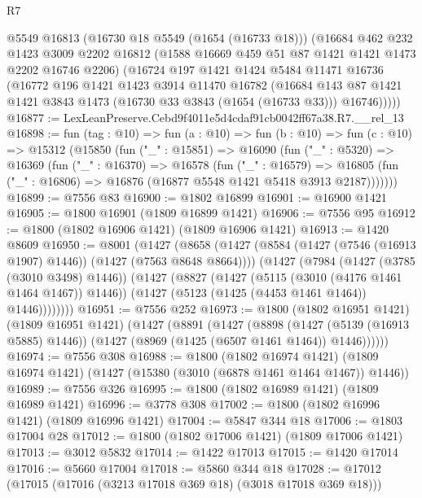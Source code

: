 \begin{lexlean}{R7}
\begin{coremodule}
      @5549
      @16813
      (@16730 @18 @5549 (@1654 (@16733 @18)))
      (@16684
        @462
        @232
        @1423
        @3009
        @2202
        @16812
        (@1588 @16669 @459 @51 @87 @1421 @1421 @1473 @2202 @16746 @2206)
        (@16724
          @197
          @1421
          @1424
          @5484
          @11471
          @16736
          (@16772
            @196
            @1421
            @1423
            @3914
            @11470
            @16782
            (@16684
              @143
              @87
              @1421
              @1421
              @3843
              @1473
              (@16730 @33 @3843 (@1654 (@16733 @33)))
              @16746)))))
@16877 := LexLeanPreserve.Cebd9f4011e5d4cdaf91cb0042ff67a38.R7.__rel_13
@16898 := fun (tag : @10) =>
  fun (a : @10) =>
  fun (b : @10) =>
  fun (c : @10) =>
  @15312
    (@15850
      (fun ("_" : @15851) =>
      @16090
        (fun ("_" : @5320) =>
        @16369
          (fun ("_" : @16370) =>
          @16578
            (fun ("_" : @16579) =>
            @16805 (fun ("_" : @16806) => @16876 (@16877 @5548 @1421 @5418 @3913 @2187)))))))
@16899 := @7556 @83
@16900 := @1802 @16899
@16901 := @16900 @1421
@16905 := @1800 @16901 (@1809 @16899 @1421)
@16906 := @7556 @95
@16912 := @1800 (@1802 @16906 @1421) (@1809 @16906 @1421)
@16913 := @1420 @8609
@16950 := @8001
    (@1427
      (@8658
        (@1427 (@8584 (@1427 (@7546 (@16913 @1907) @1446)) (@1427 (@7563 @8648 @8664))))
        (@1427
          (@7984
            (@1427 (@3785 (@3010 @3498) @1446))
            (@1427
              (@8827
                (@1427 (@5115 (@3010 (@4176 @1461 @1464 @1467)) @1446))
                (@1427 (@5123 (@1425 (@4453 @1461 @1464)) @1446))))))))
@16951 := @7556 @252
@16973 := @1800
    (@1802 @16951 @1421)
    (@1809 @16951 @1421)
    (@1427
      (@8891
        (@1427
          (@8898
            (@1427 (@5139 (@16913 @5885) @1446))
            (@1427 (@8969 (@1425 (@6507 @1461 @1464)) @1446))))))
@16974 := @7556 @308
@16988 := @1800
    (@1802 @16974 @1421)
    (@1809 @16974 @1421)
    (@1427 (@15380 (@3010 (@6878 @1461 @1464 @1467)) @1446))
@16989 := @7556 @326
@16995 := @1800 (@1802 @16989 @1421) (@1809 @16989 @1421)
@16996 := @3778 @308
@17002 := @1800 (@1802 @16996 @1421) (@1809 @16996 @1421)
@17004 := @5847 @344 @18
@17006 := @1803 @17004 @28
@17012 := @1800 (@1802 @17006 @1421) (@1809 @17006 @1421)
@17013 := @3012 @5832
@17014 := @1422 @17013
@17015 := @1420 @17014
@17016 := @5660 @17004
@17018 := @5860 @344 @18
@17028 := @17012 (@17015 (@17016 (@3213 @17018 @369 @18) (@3018 @17018 @369 @18)))

\end{coremodule}
\end{lexlean}
